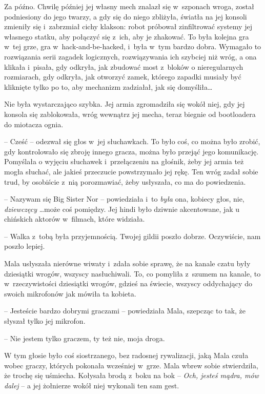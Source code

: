 \documentclass[oneside,polish,11pt,rmheadings]{mwbk}
\begin{document}
Za późno. Chwilę później jej własny mech znalazł się w~szponach wroga, został podniesiony do jego twarzy, a gdy się do niego zbliżyła, światła na jej konsoli zmieniły się i~zabrzmiał cichy klakson: robot próbował zinfiltrować systemy jej własnego statku, aby połączyć się z~ich, aby je zhakować. To była kolejna gra w~tej grze, gra w~hack-and-be-hacked, i~była w~tym bardzo dobra. Wymagało to rozwiązania serii zagadek logicznych, rozwiązywania ich szybciej niż wróg, a ona klikała i~pisała, gdy odkryła, jak zbudować most z~bloków o nieregularnych rozmiarach, gdy odkryła, jak otworzyć zamek, którego zapadki musiały być kliknięte tylko po to, aby mechanizm zadziałał, jak się domyśliła\ldots  


Nie była wystarczająco szybka. Jej armia zgromadziła się wokół niej, gdy jej konsola się zablokowała, wróg wewnątrz jej mecha, teraz biegnie od bootloadera do miotacza ognia. 


-- Cześć -- odezwał się głos w~jej słuchawkach. To było coś, co można było zrobić, gdy kontrolowało się zbroję innego gracza, można było przejąć jego komunikację. Pomyślała o wyjęciu słuchawek i~przełączeniu na głośnik, żeby jej armia też mogła słuchać, ale jakieś przeczucie powstrzymało jej rękę. Ten wróg zadał sobie trud, by osobiście z~nią porozmawiać, żeby usłyszała, co ma do powiedzenia. 


-- Nazywam się Big Sister Nor -- powiedziała i~to \textit{była }ona, kobiecy głos, nie, \textit{dziewczęcy } \ldots może coś pomiędzy. Jej hindi było dziwnie akcentowane, jak u chińskich aktorów w~filmach, które widziała. 

-- Walka z~tobą była przyjemnością. Twojej gildii poszło dobrze. Oczywiście, nam poszło lepiej.

 Mala usłyszała nierówne wiwaty i~zdała sobie sprawę, że na kanale czatu były dziesiątki wrogów, wszyscy nasłuchiwali. To, co pomyliła z~szumem na kanale, to w~rzeczywistości dziesiątki wrogów, gdzieś na świecie, wszyscy oddychający do swoich mikrofonów jak mówiła ta kobieta. 


-- Jesteście bardzo dobrymi graczami -- powiedziała Mala, szepcząc to tak, że słyszał tylko jej mikrofon. 


-- Nie jestem tylko graczem, ty też nie, moja droga. 

 W tym głosie było coś siostrzanego, bez radosnej rywalizacji, jaką Mala czuła wobec graczy, których pokonała wcześniej w~grze. Mala wbrew sobie stwierdziła, że trochę się uśmiecha. Kołysała brodą z~boku na bok -- \textit{Och, jesteś mądra, mów dalej }-- a jej żołnierze wokół niej wykonali ten sam gest. 
\end{document}
